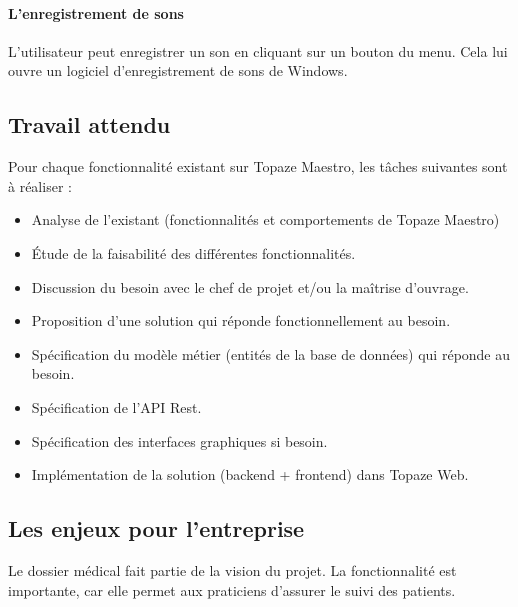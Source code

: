 \paragraph*{L'enregistrement de sons\\}
L'utilisateur peut enregistrer un son en cliquant sur un bouton du menu. Cela lui ouvre un logiciel d'enregistrement de sons de Windows.
 
\subsection{Travail attendu}

Pour chaque fonctionnalité existant sur Topaze Maestro, les tâches suivantes sont à réaliser :
\begin{itemize}
\item Analyse de l'existant (fonctionnalités et comportements de Topaze Maestro) 
\item Étude de la faisabilité des différentes fonctionnalités.
\item Discussion du besoin avec le chef de projet et/ou la maîtrise d'ouvrage.
\item Proposition d'une solution qui réponde fonctionnellement au besoin.
\item Spécification  du modèle métier (entités de la base de données) qui réponde au besoin.
\item Spécification de l'API Rest.
\item Spécification des interfaces graphiques si besoin.
\item Implémentation de la solution (backend + frontend) dans Topaze Web.
\end{itemize}

\subsection{Les enjeux pour l'entreprise}
Le dossier médical fait partie de la vision du projet. La fonctionnalité est importante, car elle permet aux praticiens d'assurer le suivi des patients.